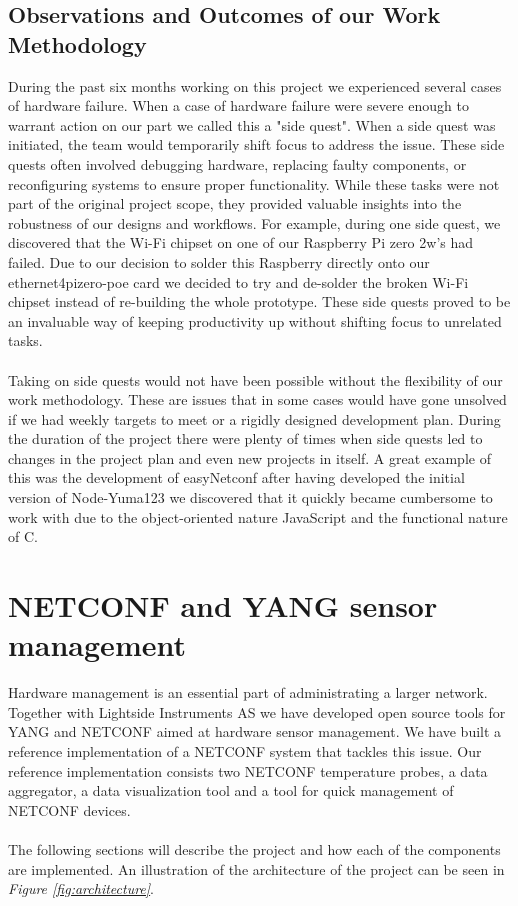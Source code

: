 \documentclass[12pt]{article}
\begin{document}
\subsection{Observations and Outcomes of our Work Methodology}
During the past six months working on this project we experienced several cases of hardware failure.
When a case of hardware failure were severe enough to warrant action on our part we called this a "side quest".
When a side quest was initiated, the team would temporarily shift focus to address the issue. 
These side quests often involved debugging hardware, replacing faulty components, 
or reconfiguring systems to ensure proper functionality. 
While these tasks were not part of the original project scope, 
they provided valuable insights into the robustness of our designs and workflows. 
For example, during one side quest, we discovered that the Wi-Fi chipset on one of 
our Raspberry Pi zero 2w's had failed. Due to our decision to solder this Raspberry 
directly onto our ethernet4pizero-poe card we decided to try and de-solder the broken Wi-Fi chipset
instead of re-building the whole prototype. 
These side quests proved to be an invaluable way of keeping 
productivity up without shifting focus to unrelated tasks. 
\\
\\
Taking on side quests would not have been possible without the flexibility 
of our work methodology. These are issues that in some cases would have gone 
unsolved if we had weekly targets to meet or a rigidly designed development plan.
During the duration of the project there were plenty of times when side quests led 
to changes in the project plan and even new projects in itself. A great example of this 
was the development of easyNetconf after having developed the initial version of Node-Yuma123
we discovered that it quickly became cumbersome to work with due to the object-oriented nature 
JavaScript and the functional nature of C. 

\section{NETCONF and YANG sensor management}

Hardware management is an essential part of administrating a larger network. 
Together with Lightside Instruments AS we have 
developed open source tools for YANG and NETCONF aimed at hardware sensor management.
We have built a reference implementation of a NETCONF system that tackles this issue.
Our reference implementation consists two NETCONF temperature probes,
a data aggregator, a data visualization tool and
a tool for quick management of NETCONF devices.
\\
\\
The following sections will describe the project and how each of the components are implemented.
An illustration of the architecture of the project can be seen in \textit{Figure \ref{fig:architecture}}.
\end{document}
